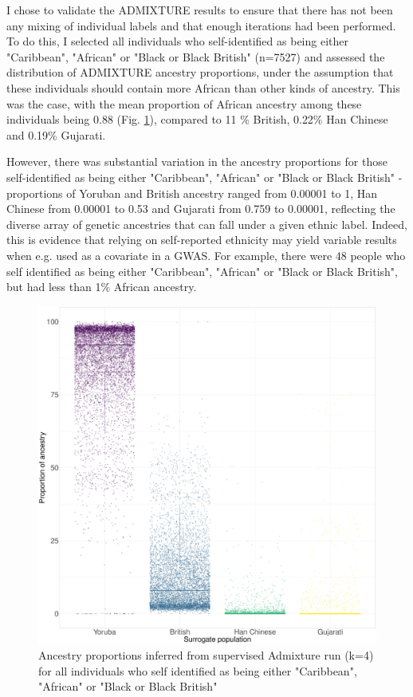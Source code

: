I chose to validate the ADMIXTURE results to ensure that there has not been any mixing of individual labels and that enough iterations had been performed. To do this, I selected all individuals who self-identified as being either "Caribbean", "African" or "Black or Black British" (n=7527) and assessed the distribution of ADMIXTURE ancestry proportions, under the assumption that these individuals should contain more African than other kinds of ancestry. This was the case, with the mean proportion of African ancestry among these individuals being 0.88 (Fig. \ref{fig:African_Inds_proportions_ADMIXTURE}), compared to 11 \% British, 0.22\% Han Chinese and 0.19\% Gujarati.

However, there was substantial variation in the ancestry proportions for those self-identified as being either "Caribbean", "African" or "Black or Black British" - proportions of Yoruban and British ancestry ranged from 0.00001 to 1, Han Chinese from 0.00001 to 0.53 and Gujarati from 0.759 to 0.00001, reflecting the diverse array of genetic ancestries that can fall under a given ethnic label. Indeed, this is evidence that relying on self-reported ethnicity may yield variable results when e.g. used as a covariate in a GWAS. For example, there were 48 people who self identified as being either "Caribbean", "African" or "Black or Black British", but had less than 1\% African ancestry.

\begin{figure}[htp]
    \centering
    \includegraphics[width=1.0\textwidth]{../images/chapter3/African_Inds_proportions.pdf}
    \caption{Ancestry proportions inferred from supervised Admixture run (k=4) for all individuals who self identified as being either "Caribbean", "African" or "Black or Black British"}
    \label{fig:African_Inds_proportions_ADMIXTURE}
\end{figure}

